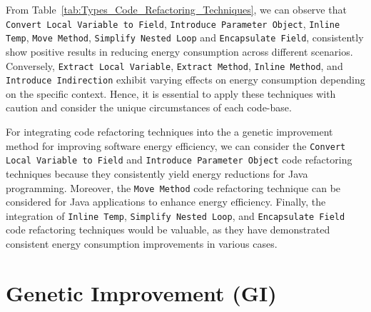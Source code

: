 From Table~\ref{tab:Types_Code_Refactoring_Techniques}, we can observe that \texttt{Convert Local Variable to Field}, \texttt{Introduce Parameter Object}, \texttt{Inline Temp}, \texttt{Move Method}, \texttt{Simplify Nested Loop} and \texttt{Encapsulate Field}, consistently show positive results in reducing energy consumption across different scenarios. 
%
%
Conversely, \texttt{Extract Local Variable}, \texttt{Extract Method}, \texttt{Inline Method}, and \texttt{Introduce Indirection} exhibit varying effects on energy consumption depending on the specific context. Hence, it is essential to apply these techniques with caution and consider the unique circumstances of each code-base.

\vspace{.5em}
For integrating code refactoring techniques into the
a genetic improvement method %
for improving software energy efficiency, we can consider 
the \texttt{Convert Local Variable to Field} and \texttt{Introduce Parameter Object} code refactoring techniques because they consistently yield energy reductions for Java programming. Moreover, the \texttt{Move Method} code refactoring technique
can be considered for Java applications to enhance energy efficiency. Finally, the integration of \texttt{Inline Temp}, \texttt{Simplify Nested Loop}, and \texttt{Encapsulate Field} code refactoring techniques would be valuable, as they have demonstrated consistent energy consumption improvements in various cases. 


\section{Genetic Improvement (GI)}

